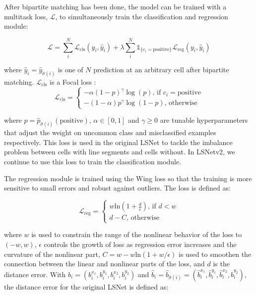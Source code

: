 \documentclass[journal]{IEEEtran}
\begin{document}
After bipartite matching has been done, the model can be trained with a multitask loss, $\mathcal{L}$, to simultaneously train the classification and regression module:

\begin{equation} \label{multitask_training_loss}
\mathcal{L} = \sum_i^N\mathcal{L}_{\text{cls}}(y_i, \hat{y}_i) + \lambda \sum_i^N\mathds{1}_{\{c_i=\text{positive}\}}\mathcal{L}_\text{reg}(y_i, \hat{y}_i) 
\end{equation}

where $\hat{y}_i = \hat{y}_{\hat{\sigma}(i)}$ is one of $N$ prediction at an arbitrary cell after bipartite matching. $\mathcal{L}_{\text{cls}}$ is a Focal loss \cite{focal_loss}:
\begin{equation}
  \mathcal{L}_{\text{cls}} =
    \begin{cases}
      -\alpha (1 - p)^\gamma \log(p) \text{,  if  } c_i=\text{positive} \\
      -(1 - \alpha)p^\gamma \log(1-p) \text{,  otherwise} 
    \end{cases}       
\end{equation}

where $p=\hat{p}_{\hat{\sigma}(i)}(\text{positive})$, $\alpha \in [0, 1]$ and $\gamma \geq 0$ are tunable hyperparameters that adjust the weight on uncommon class and misclassified examples respectively. This loss is used in the original LSNet to tackle the imbalance problem between cells with line segments and cells without. In LSNetv2, we continue to use this loss to train the classification module.

The regression module is trained using the Wing loss \cite{wing_loss} so that the training is more sensitive to small errors and robust against outliers. The loss is defined as:

\begin{equation}
  \mathcal{L}_{\text{reg}} =
    \begin{cases}
      w \text{ln} (1 + \frac{d}{\epsilon}) \text{, if } d < w \\
      d - C \text{,  otherwise}
    \end{cases}       
\end{equation}

where $w$ is used to constrain the range of the nonlinear behavior of the loss to $(-w, w)$, $\epsilon$ controls the growth of loss as regression error increases and the curvature of the nonlinear part, $C = w - w\text{ln}(1 + w / \epsilon)$ is used to smoothen the connection between the linear and nonlinear parts of the loss, and $d$ is the distance error. With $b_i = (b_i^{x_1}, b_i^{y_1}, b_i^{x_2}, b_i^{y_2})$ and $\hat{b}_i = \hat{b}_{\hat{\sigma}(i)} = (\hat{b}_i^{x_1}, \hat{b}_i^{y_1}, \hat{b}_i^{x_2}, \hat{b}_i^{y_2})$, the distance error for the original LSNet is defined as:
\end{document}
